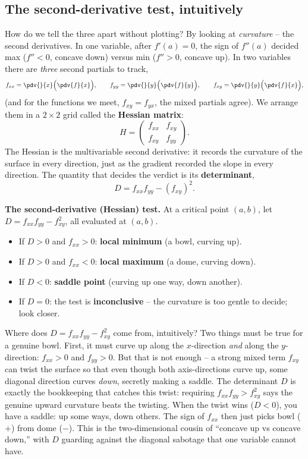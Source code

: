 \subsection{The second-derivative test, intuitively}

How do we tell the three apart without plotting? By looking at \emph{curvature} --
the second derivatives. In one variable, after $f'(a)=0$, the sign of $f''(a)$
decided max ($f''<0$, concave down) versus min ($f''>0$, concave up). In two
variables there are \emph{three} second partials to track,
\[
  f_{xx} = \pdv{}{x}\Big(\pdv{f}{x}\Big),\qquad
  f_{yy} = \pdv{}{y}\Big(\pdv{f}{y}\Big),\qquad
  f_{xy} = \pdv{}{y}\Big(\pdv{f}{x}\Big),
\]
(and for the functions we meet, $f_{xy}=f_{yx}$, the mixed partials agree). We
arrange them in a $2\times 2$ grid called the \textbf{Hessian matrix}:
\[
  H = \begin{pmatrix} f_{xx} & f_{xy} \\ f_{xy} & f_{yy}\end{pmatrix}.
\]
The Hessian is the multivariable second derivative: it records the curvature of
the surface in every direction, just as the gradient recorded the slope in every
direction. The quantity that decides the verdict is its \textbf{determinant},
\[
  D = f_{xx}f_{yy} - (f_{xy})^2.
\]

\begin{focusbox}
\textbf{The second-derivative (Hessian) test.} At a critical point $(a,b)$, let
$D = f_{xx}f_{yy} - f_{xy}^2$, all evaluated at $(a,b)$.
\begin{itemize}
\item If $D>0$ and $f_{xx}>0$: \textbf{local minimum} (a bowl, curving up).
\item If $D>0$ and $f_{xx}<0$: \textbf{local maximum} (a dome, curving down).
\item If $D<0$: \textbf{saddle point} (curving up one way, down another).
\item If $D=0$: the test is \textbf{inconclusive} -- the curvature is too gentle
to decide; look closer.
\end{itemize}
\end{focusbox}

\begin{intuitionbox}
Where does $D = f_{xx}f_{yy}-f_{xy}^2$ come from, intuitively? Two things must be
true for a genuine bowl. First, it must curve up along the $x$-direction
\emph{and} along the $y$-direction: $f_{xx}>0$ and $f_{yy}>0$. But that is not
enough -- a strong mixed term $f_{xy}$ can twist the surface so that even though
both axis-directions curve up, some diagonal direction curves \emph{down},
secretly making a saddle. The determinant $D$ is exactly the bookkeeping that
catches this twist: requiring $f_{xx}f_{yy} > f_{xy}^2$ says the genuine upward
curvature beats the twisting. When the twist wins ($D<0$), you have a saddle: up
some ways, down others. The sign of $f_{xx}$ then just picks bowl ($+$) from dome
($-$). This is the two-dimensional cousin of ``concave up vs concave down,'' with
$D$ guarding against the diagonal sabotage that one variable cannot have.
\end{intuitionbox}

